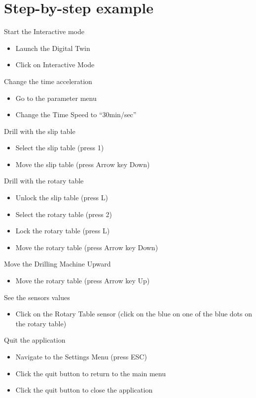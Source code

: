 \documentclass{article}
\begin{document}
\section{Step-by-step example}
Start the Interactive mode
\begin{itemize}
    \item Launch the Digital Twin
    \item Click on Interactive Mode
\end{itemize}
Change the time acceleration
\begin{itemize}
	\item Go to the parameter menu
	\item Change the Time Speed to “30min/sec”
\end{itemize}
Drill with the slip table
\begin{itemize}
    \item Select the slip table (press 1)
    \item Move the slip table (press Arrow key Down)
\end{itemize}
Drill with the rotary table
\begin{itemize}
    \item Unlock the slip table (press L)
    \item Select the rotary table (press 2)
    \item Lock the rotary table (press L)
    \item Move the rotary table (press Arrow key Down)
\end{itemize}
Move the Drilling Machine Upward
\begin{itemize}
    \item Move the rotary table (press Arrow key Up)
\end{itemize}
See the sensors values
\begin{itemize}
    \item Click on the Rotary Table sensor (click on the blue on one of the blue dots on the rotary table)
\end{itemize}
Quit the application
\begin{itemize}
    \item Navigate to the Settings Menu (press ESC)
    \item Click the quit button to return to the main menu
    \item Click the quit button to close the application
\end{itemize}
\end{document}
